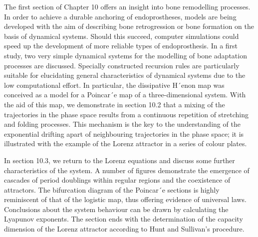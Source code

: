 \documentclass[12pt]{article}
\begin{document}
\hfill

The first section of Chapter 10 offers an insight into bone remodelling processes. In
order to achieve a durable anchoring of endoprostheses, models are being developed
with the aim of describing bone retrogression or bone formation on the basis of dynamical
systems. Should this succeed, computer simulations could speed up the
development of more reliable types of endoprosthesis. In a first study, two very simple
dynamical systems for the modelling of bone adaptation processes are discussed.
Specially constructed recursion rules are particularly suitable for elucidating general
characteristics of dynamical systems due to the low computational effort. In
particular, the dissipative H´enon map was conceived as a model for a Poincar´e
map of a three-dimensional system. With the aid of this map, we demonstrate in
section 10.2 that a mixing of the trajectories in the phase space results from a continuous
repetition of stretching and folding processes. This mechanism is the key
to the understanding of the exponential drifting apart of neighbouring trajectories
in the phase space; it is illustrated with the example of the Lorenz attractor in a
series of colour plates.

\hfill

In section 10.3, we return to the Lorenz equations and discuss some further characteristics
of the system. A number of figures demonstrate the emergence of cascades
of period doublings within regular regions and the coexistence of attractors. The
bifurcation diagram of the Poincar´e sections is highly reminiscent of that of the logistic
map, thus offering evidence of universal laws. Conclusions about the system
behaviour can be drawn by calculating the Lyapunov exponents. The section ends
with the determination of the capacity dimension of the Lorenz attractor according
to Hunt and Sullivan’s procedure.

\hfill
\end{document}
